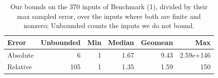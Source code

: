 \begin{table}[H] \centering
\caption{Our bounds on the 370 inputs of Benchmark (1), divided by their max sampled error, over the inputs where both are finite and nonzero; Unbounded counts the inputs we do not bound.}\label{tab:sampled}
\begin{tabular}{lrrrrr}
\toprule
Error & Unbounded & Min & Median & Geomean & Max \\
\midrule
Absolute & 6 & 1 & 1.67 & 9.43 & 2.59e+146 \\
Relative & 105 & 1 & 1.35 & 1.59 & 150 \\
\bottomrule
\end{tabular}
\end{table}

